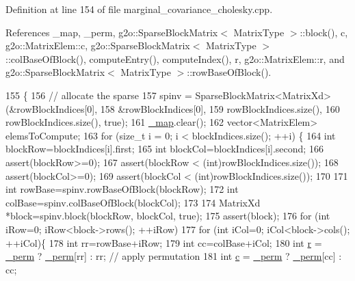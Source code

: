 Definition at line 154 of file marginal\+\_\+covariance\+\_\+cholesky.\+cpp.



References \+\_\+map, \+\_\+perm, g2o\+::\+Sparse\+Block\+Matrix$<$ Matrix\+Type $>$\+::block(), c, g2o\+::\+Matrix\+Elem\+::c, g2o\+::\+Sparse\+Block\+Matrix$<$ Matrix\+Type $>$\+::col\+Base\+Of\+Block(), compute\+Entry(), compute\+Index(), r, g2o\+::\+Matrix\+Elem\+::r, and g2o\+::\+Sparse\+Block\+Matrix$<$ Matrix\+Type $>$\+::row\+Base\+Of\+Block().


\begin{DoxyCode}
155 \{
156   \textcolor{comment}{// allocate the sparse}
157   spinv = SparseBlockMatrix<MatrixXd>(&rowBlockIndices[0], 
158               &rowBlockIndices[0], 
159               rowBlockIndices.size(),
160               rowBlockIndices.size(), \textcolor{keyword}{true});
161   \hyperlink{classg2o_1_1MarginalCovarianceCholesky_a7a9d21e9ee6654b9e6d69a62e87c201a}{\_map}.clear();
162   vector<MatrixElem> elemsToCompute;
163   \textcolor{keywordflow}{for} (\textcolor{keywordtype}{size\_t} i = 0; i < blockIndices.size(); ++i) \{
164     \textcolor{keywordtype}{int} blockRow=blockIndices[i].first;    
165     \textcolor{keywordtype}{int} blockCol=blockIndices[i].second;
166     assert(blockRow>=0);
167     assert(blockRow < (\textcolor{keywordtype}{int})rowBlockIndices.size());
168     assert(blockCol>=0);
169     assert(blockCol < (\textcolor{keywordtype}{int})rowBlockIndices.size());
170 
171     \textcolor{keywordtype}{int} rowBase=spinv.rowBaseOfBlock(blockRow);
172     \textcolor{keywordtype}{int} colBase=spinv.colBaseOfBlock(blockCol);
173     
174     MatrixXd *block=spinv.block(blockRow, blockCol, \textcolor{keyword}{true});
175     assert(block);
176     \textcolor{keywordflow}{for} (\textcolor{keywordtype}{int} iRow=0; iRow<block->rows(); ++iRow)
177       \textcolor{keywordflow}{for} (\textcolor{keywordtype}{int} iCol=0; iCol<block->cols(); ++iCol)\{
178   \textcolor{keywordtype}{int} rr=rowBase+iRow;
179   \textcolor{keywordtype}{int} cc=colBase+iCol;
180         \textcolor{keywordtype}{int} \hyperlink{sparse__block__matrix_8hpp_acab531abaa74a7e664e3986f2522b33a}{r} = \hyperlink{classg2o_1_1MarginalCovarianceCholesky_a404f5d0ce82c2877324bafb8997b96aa}{\_perm} ? \hyperlink{classg2o_1_1MarginalCovarianceCholesky_a404f5d0ce82c2877324bafb8997b96aa}{\_perm}[rr] : rr; \textcolor{comment}{// apply permutation}
181         \textcolor{keywordtype}{int} \hyperlink{sparse__block__matrix_8hpp_a4e1e0e72dd773439e333c84dd762a9c3}{c} = \hyperlink{classg2o_1_1MarginalCovarianceCholesky_a404f5d0ce82c2877324bafb8997b96aa}{\_perm} ? \hyperlink{classg2o_1_1MarginalCovarianceCholesky_a404f5d0ce82c2877324bafb8997b96aa}{\_perm}[cc] : cc;

\end{DoxyCode}
